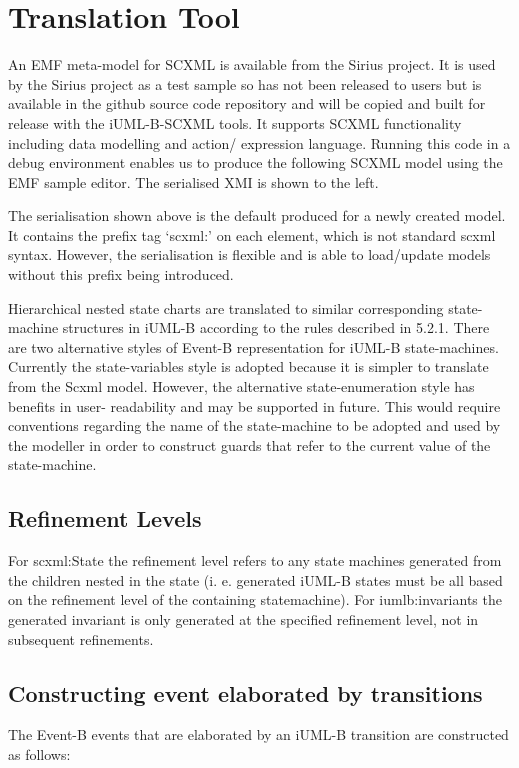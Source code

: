 
\section{Translation Tool}

An EMF meta-model for SCXML is available from the Sirius 
project. It is used by the Sirius project as a test sample 
so has not been released to users but is available in the 
github source code repository and will be copied and built 
for release with the iUML-B-SCXML tools. It supports SCXML 
functionality including data modelling and action/
expression language. 
Running this code in a debug environment enables us to 
produce the following SCXML model using the EMF sample 
editor. The serialised XMI is shown to the left. 

The serialisation shown above is the default produced for a 
newly created model. It contains the prefix tag ‘scxml:’ on 
each element, which is not standard scxml syntax. However, 
the serialisation is flexible and is able to load/update 
models without this prefix being introduced.

Hierarchical nested state charts are translated to similar 
corresponding state-machine structures in iUML-B according 
to the rules described in 5.2.1. There are two alternative 
styles of Event-B representation for iUML-B state-machines. 
Currently the state-variables style is adopted because it 
is simpler to translate from the Scxml model. However, the 
alternative state-enumeration style has benefits in user-
readability and may be supported in future. This would 
require conventions regarding the name of the state-machine 
to be adopted and used by the modeller in order to 
construct guards that refer to the current value of the 
state-machine.

\subsection{Refinement Levels}
For scxml:State the refinement level refers to any state 
machines generated from the children nested in the state (i.
e. generated iUML-B states must be all based on the 
refinement level of the containing statemachine).
For iumlb:invariants the generated invariant is only 
generated at the specified refinement level, not in 
subsequent refinements.

\subsection{Constructing event elaborated by transitions}
The Event-B events that are elaborated by an iUML-B 
transition are constructed as follows:

